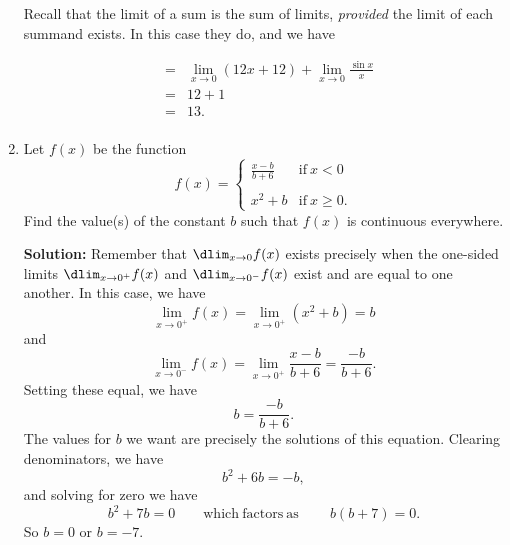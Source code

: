 \documentclass{article}
\begin{document}
\begin{enumerate}
Recall that the limit of a sum is the sum of limits, \emph{provided} the limit of each summand exists. In this case they do, and we have

\begin{eqnarray*}
 & = & \lim_{x \rightarrow 0} \left( 12 x + 12 \right) + \lim_{x \rightarrow 0} \frac{\sin x}{x} \\
 & = & 12 + 1 \\
 & = & 13. \\
\end{eqnarray*}


  
\vspace{1cm}

\item Let $f(x)$ be the function \[ f(x) = \left\{ \begin{array}{ll} \frac{x-b}{b + 6} & \mathrm{if}\ x < 0 \\ & \\ x^2 + b & \mathrm{if}\ x \geq 0. \end{array}\right. \] Find the value(s) of the constant $b$ such that $f(x)$ is continuous everywhere.

\textbf{Solution:} Remember that $\dlim_{x \rightarrow 0} f(x)$ exists precisely when the one-sided limits $\dlim_{x \rightarrow 0^+} f(x)$ and $\dlim_{x \rightarrow 0^-} f(x)$ exist and are equal to one another. In this case, we have \[ \lim_{x \rightarrow 0^+} f(x) = \lim_{x \rightarrow 0^+} (x^2 + b) = b \] and \[ \lim_{x \rightarrow 0^-} f(x) = \lim_{x \rightarrow 0^+} \frac{x-b}{b + 6} = \frac{-b}{b + 6}. \]
Setting these equal, we have \[ b = \frac{-b}{b + 6}. \]
The values for $b$ we want are precisely the solutions of this equation.
Clearing denominators, we have \[ b^2 + 6 b = -b, \] and solving for zero we have \[ b^2 + 7b = 0 \quad\quad \mathrm{which\ factors\ as}\ \quad\quad b (b + 7) = 0. \]
So $b = 0$ or $b = -7$.

  
\vspace{1cm}
\end{enumerate}
\end{document}
